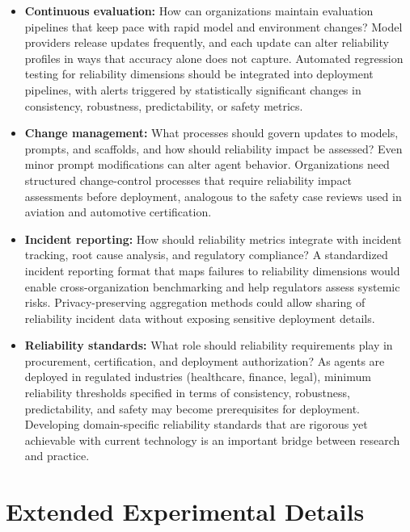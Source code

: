 \documentclass[11pt]{article}
\newcounter{dimension}
\begin{document}
\begin{itemize}[leftmargin=*]
    \item \textbf{Continuous evaluation:} How can organizations maintain evaluation pipelines that keep pace with rapid model and environment changes?
    Model providers release updates frequently, and each update can alter reliability profiles in ways that accuracy alone does not capture.
    Automated regression testing for reliability dimensions should be integrated into deployment pipelines, with alerts triggered by statistically significant changes in consistency, robustness, predictability, or safety metrics.

    \item \textbf{Change management:} What processes should govern updates to models, prompts, and scaffolds, and how should reliability impact be assessed?
    Even minor prompt modifications can alter agent behavior.
    Organizations need structured change-control processes that require reliability impact assessments before deployment, analogous to the safety case reviews used in aviation and automotive certification.

    \item \textbf{Incident reporting:} How should reliability metrics integrate with incident tracking, root cause analysis, and regulatory compliance?
    A standardized incident reporting format that maps failures to reliability dimensions would enable cross-organization benchmarking and help regulators assess systemic risks.
    Privacy-preserving aggregation methods could allow sharing of reliability incident data without exposing sensitive deployment details.

    \item \textbf{Reliability standards:} What role should reliability requirements play in procurement, certification, and deployment authorization?
    As agents are deployed in regulated industries (healthcare, finance, legal), minimum reliability thresholds specified in terms of consistency, robustness, predictability, and safety may become prerequisites for deployment.
    Developing domain-specific reliability standards that are rigorous yet achievable with current technology is an important bridge between research and practice.
\end{itemize}


\section{Extended Experimental Details}
\label{appendix:experimental_details}
\end{document}
